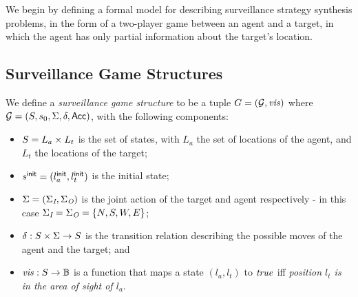 We begin by defining a formal model for describing surveillance strategy synthesis problems, in the form of a two-player game between an agent and a target, in which the agent has only partial information about the target's location.

\subsection{Surveillance Game Structures}\label{sec:surveillance-games}
We define a \emph{surveillance game structure} to be  a tuple $G = (\mathcal{G},\mathit{vis})$ where $\mathcal{G}  = (S,
s_0, \Sigma, \delta, \mathsf{Acc})$, with the following components:
\begin{itemize}
\item $S = L_a \times L_t$ is the set of states, with $L_a$ the set of locations of the agent, and $L_t$ the locations of the target;
\item $s^{\mathsf{init}} = (l_a^{\mathsf{init}},l_t^{\mathsf{init}})$ is the initial state;
\item $\Sigma = (\Sigma_{\textit{I}},\Sigma_{\textit{O}})$ is the joint action of the target and agent respectively - in this case $\Sigma_{\textit{I}} = \Sigma_{\textit{O}} = \{N,S,W,E\}$;
\item $\delta: S \times \Sigma \rightarrow S$ is the transition relation describing the possible moves of the agent and the target; and
\item $\mathit{vis} : S \to \mathbb{B}$ is a function that maps a state $(l_a,l_t)$ to $\mathit{true}$ iff \emph{ position $l_t$ is in the area of sight of $l_a$}.
\end{itemize}


